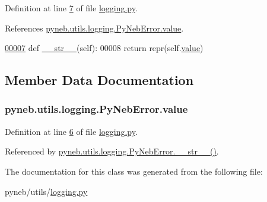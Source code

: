 Definition at line \hyperlink{logging_8py_source_l00007}{7} of file \hyperlink{logging_8py_source}{logging.\+py}.



References \hyperlink{logging_8py_source_l00006}{pyneb.\+utils.\+logging.\+Py\+Neb\+Error.\+value}.


\begin{DoxyCode}
\hypertarget{classpyneb_1_1utils_1_1logging_1_1_py_neb_error_l00007}{}\hyperlink{classpyneb_1_1utils_1_1logging_1_1_py_neb_error_a5679076c6188021f71aeffa2caee4fd3}{00007}     \textcolor{keyword}{def }\hyperlink{classpyneb_1_1utils_1_1logging_1_1_py_neb_error_a5679076c6188021f71aeffa2caee4fd3}{\_\_str\_\_}(self):
00008         \textcolor{keywordflow}{return} repr(self.\hyperlink{classpyneb_1_1utils_1_1logging_1_1_py_neb_error_aec64ebee7cc44f3c40b15959cfeb2efb}{value})    
\end{DoxyCode}


\subsection{Member Data Documentation}
\hypertarget{classpyneb_1_1utils_1_1logging_1_1_py_neb_error_aec64ebee7cc44f3c40b15959cfeb2efb}{}
\subsubsection[{value}]{\setlength{\rightskip}{0pt plus 5cm}pyneb.\+utils.\+logging.\+Py\+Neb\+Error.\+value}\label{classpyneb_1_1utils_1_1logging_1_1_py_neb_error_aec64ebee7cc44f3c40b15959cfeb2efb}


Definition at line \hyperlink{logging_8py_source_l00006}{6} of file \hyperlink{logging_8py_source}{logging.\+py}.



Referenced by \hyperlink{logging_8py_source_l00007}{pyneb.\+utils.\+logging.\+Py\+Neb\+Error.\+\_\+\+\_\+str\+\_\+\+\_\+()}.



The documentation for this class was generated from the following file\+:\begin{DoxyCompactItemize}
\item 
pyneb/utils/\hyperlink{logging_8py}{logging.\+py}\end{DoxyCompactItemize}
